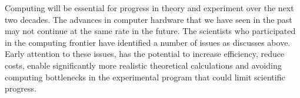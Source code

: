 Computing will be essential for progress in theory and experiment
over the next two decades.  The advances in computer hardware that
we have seen in the past may not continue at the same rate in the
future.  The scientists who participated in the computing 
frontier have identified a number of issues as discusses above.
Early attention to these issues, has the potential to increase 
efficiency, reduce costs, enable significantly more realistic
theoretical calculations and avoiding computing bottlenecks in
the experimental program that could limit scientific progress.
